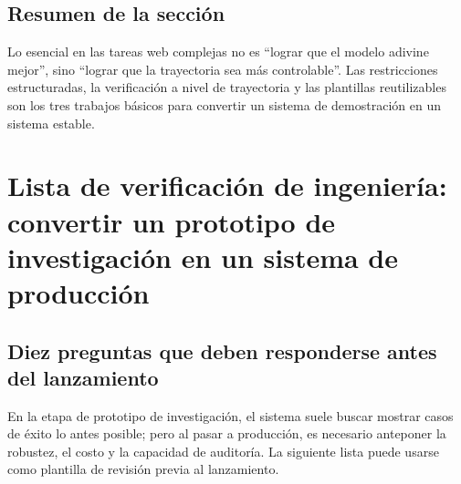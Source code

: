 \documentclass[a4paper]{article}
\begin{document}
\subsection{Resumen de la sección}
Lo esencial en las tareas web complejas no es ``lograr que el modelo adivine mejor'', sino ``lograr que la trayectoria sea más controlable''. Las restricciones estructuradas, la verificación a nivel de trayectoria y las plantillas reutilizables son los tres trabajos básicos para convertir un sistema de demostración en un sistema estable.
\section{Lista de verificación de ingeniería: convertir un prototipo de investigación en un sistema de producción}

\subsection{Diez preguntas que deben responderse antes del lanzamiento}
En la etapa de prototipo de investigación, el sistema suele buscar mostrar casos de éxito lo antes posible; pero al pasar a producción, es necesario anteponer la robustez, el costo y la capacidad de auditoría. La siguiente lista puede usarse como plantilla de revisión previa al lanzamiento.
\end{document}

